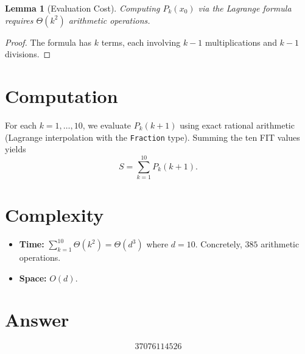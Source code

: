 \documentclass[12pt]{article}
\newtheorem{lemma}[theorem]{Lemma}
\begin{document}
\begin{lemma}[Evaluation Cost]
Computing $P_k(x_0)$ via the Lagrange formula requires $\Theta(k^2)$ arithmetic operations.
\end{lemma}

\begin{proof}
The formula has $k$ terms, each involving $k-1$ multiplications and $k-1$ divisions.
\end{proof}

\section{Computation}

For each $k = 1, \ldots, 10$, we evaluate $P_k(k+1)$ using exact rational arithmetic (Lagrange interpolation with the \texttt{Fraction} type). Summing the ten FIT values yields
\[
S = \sum_{k=1}^{10} P_k(k+1).
\]

\section{Complexity}

\begin{itemize}
\item \textbf{Time:} $\sum_{k=1}^{10} \Theta(k^2) = \Theta(d^3)$ where $d = 10$. Concretely, $385$ arithmetic operations.
\item \textbf{Space:} $O(d)$.
\end{itemize}

\section{Answer}

\[
\boxed{37076114526}
\]
\end{document}
